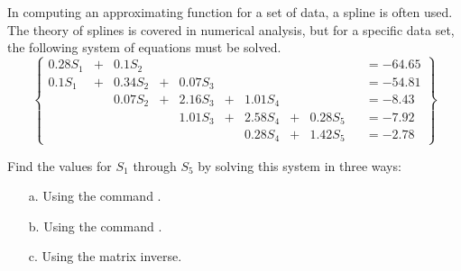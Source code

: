 {In computing an approximating function for a set of data, a spline is often used.  The theory of splines is covered in numerical analysis, but for a specific data set, the following system of equations must be solved.
\[
\left\{
\begin{array}{ccccccccccc}
0.28 S_1 &+& 0.1 S_2 &&&&&&&&= -64.65\\
0.1 S_1 &+& 0.34 S_2 &+ &0.07 S_3 &&&&&&= -54.81\\
&&0.07 S_2 &+& 2.16 S_3 &+ &1.01 S_4 &&&&= - 8.43\\
&&&&1.01 S_3 &+ &2.58 S_4 &+& 0.28 S_5 &&= -7.92\\
&&&&&&0.28 S_4 &+ &1.42 S_5 &&= -2.78
\end{array}
\right\}
\]

Find the values for $S_1$ through $S_5$ by solving this system in three ways:
\begin{enumerate}
\item[a.] Using the command .
\item[b.] Using the command .
\item[c.] Using the matrix inverse.
\end{enumerate}}
{}